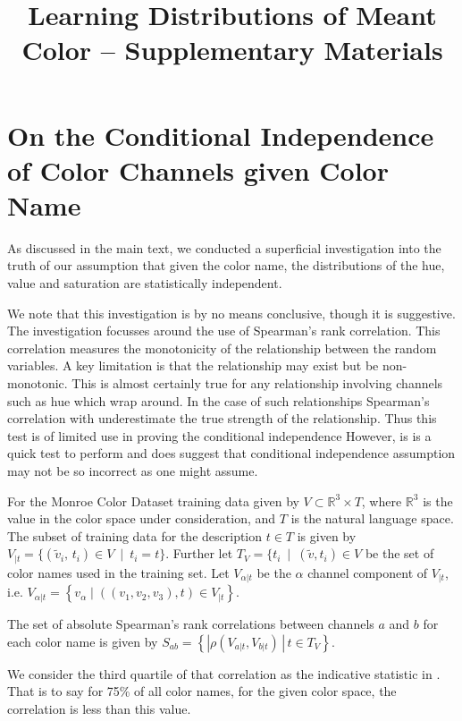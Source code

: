\documentclass[11pt,letterpaper]{article}
\title{Learning Distributions of Meant Color -- Supplementary Materials}
\author{}
\date{}
\begin{document}
\maketitle

\section{On the Conditional Independence of Color Channels given Color Name}

As discussed in the main text, we conducted a superficial investigation into the truth of our assumption that given the color name, the distributions of the hue, value and saturation are statistically independent.

We note that this investigation is by no means conclusive, though it is suggestive.
The investigation focusses around the use of Spearman's rank correlation.
This correlation measures the monotonicity of the relationship between the random variables.
A key limitation is that the relationship may exist but be non-monotonic.
This is almost certainly true for any relationship involving channels such as hue which wrap around.
In the case of such relationships Spearman's correlation with underestimate the true strength of the relationship.
Thus this test is of limited use in proving the conditional independence
However, is is a quick test to perform and does suggest that conditional independence assumption may not be so incorrect as one might assume.


For the Monroe Color Dataset training data  given by $V \subset \mathbb{R}^{3}\times T$, where $\mathbb{R}^{3}$ is the value in the color space under consideration, and $T$ is the natural language space.
The subset of training data for the description $t \in T$ is given by
$V_{|t}=\{(\tilde{v}_i,\,t_i) \in V \: \mid \: t_{i}=t\}$.
Further let $T_V = \{t_i \: \mid \: (\tilde{v},t_i)\in V$ be the set of color names used in the training set.
Let $V_{\alpha|t}$ be the $\alpha$ channel component of $V_{|t}$, i.e. $V_{\alpha|t} = \left\lbrace v_\alpha \mid ((v_1,v_2,v_3), t) \in V_{|t} \right\rbrace$.

The set of absolute Spearman's rank correlations between channels $a$ and $b$ for each color name is given by
$S_{ab}=\left\lbrace \left|\rho(V_{a|t},V_{b|t})\,\right|\,t\in T_{V}\right\rbrace$.

We consider the third quartile of that correlation as the indicative statistic in .
That is to say for 75\% of all color names, for the given color space, the correlation is less than this value.
\end{document}
